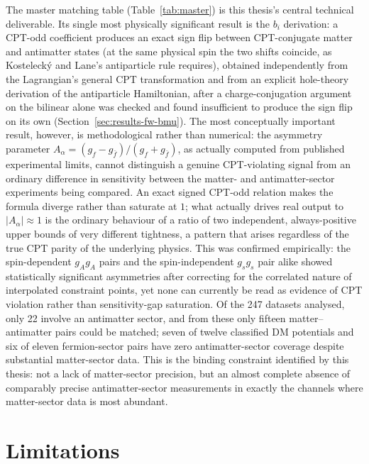 The master matching table (Table~\ref{tab:master}) is this thesis's
central technical deliverable. Its single most physically significant
result is the $b_i$ derivation: a CPT-odd coefficient produces an
exact sign flip between CPT-conjugate matter and antimatter states (at the
same physical spin the two shifts coincide, as Kostelecký and Lane's
antiparticle rule requires), obtained independently from
the Lagrangian's general CPT transformation and from an explicit
hole-theory derivation of the antiparticle Hamiltonian, after a
charge-conjugation argument on the bilinear alone was checked and found
insufficient to produce the sign flip on its own (Section~\ref{sec:results-fw-bmu}).
The most conceptually important result,
however, is methodological rather than numerical: the asymmetry parameter
$A_\alpha=(g_f-g_{\bar f})/(g_f+g_{\bar f})$, as actually computed from
published experimental limits, cannot distinguish a genuine CPT-violating
signal from an ordinary difference in sensitivity between the matter- and
antimatter-sector experiments being compared. An exact signed CPT-odd
relation makes the formula diverge rather than saturate at $1$; what
actually drives real output to $|A_\alpha|\approx1$ is the ordinary
behaviour of a ratio of two independent, always-positive upper bounds of
very different tightness, a pattern that arises regardless of the true CPT
parity of the underlying physics. This was confirmed empirically: the
spin-dependent $g_Ag_A$ pairs and the spin-independent $g_sg_s$ pair alike
showed statistically significant asymmetries after correcting for the correlated
nature of interpolated constraint points, yet none can currently be read
as evidence of CPT violation rather than sensitivity-gap saturation. Of the
247 datasets analysed, only 22 involve an antimatter sector, and from
these only fifteen matter--antimatter pairs could be matched; seven of twelve
classified DM potentials and six of eleven fermion-sector pairs have zero
antimatter-sector coverage despite substantial matter-sector data. This is
the binding constraint identified by this thesis: not a lack of
matter-sector precision, but an almost complete absence of comparably
precise antimatter-sector measurements in exactly the channels where
matter-sector data is most abundant.

\section{Limitations}

